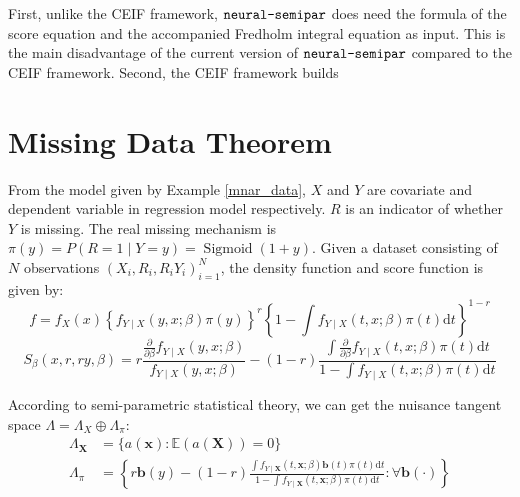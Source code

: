 \documentclass[11pt]{article}
\def\neurosemi{{\normalfont\texttt{neural-semipar}}}
\begin{document}
First, unlike the CEIF framework, $\neurosemi$ does need the formula of the score equation and the accompanied Fredholm integral equation as input. This is the main disadvantage of the current version of $\neurosemi$ compared to the CEIF framework. Second, the CEIF framework builds

\section{Missing Data Theorem}
\label{MNAR_Theorem}

From the model given by Example \ref{mnar_data}, $X$ and $Y$ are covariate and dependent variable in regression model respectively. $R$ is an indicator of whether $Y$ is missing. The real missing mechanism is $\pi(y)=P(R=1 \mid Y=y)=\operatorname{Sigmoid}(1+y)$. Given a dataset consisting of $N$ observations $(X_i,R_i,R_iY_i)^N_{i=1}$, the density function and score function is given by:
$$
f = f_X(x)\left\{f_{Y \mid X}(y, x ; \beta) \pi(y)\right\}^r\left\{1-\int f_{Y \mid X}(t, x ; \beta) \pi(t) \mathrm{d} t\right\}^{1-r}
$$
$$
S_\beta(x, r, r y, \beta)=r \frac{\frac{\partial}{\partial \beta} f_{Y \mid X}(y, x ; \beta)}{f_{Y \mid X}(y, x ; \beta)}-(1-r) \frac{\int \frac{\partial}{\partial \beta} f_{Y \mid X}(t, x ; \beta) \pi(t) \mathrm{d} t}{1-\int f_{Y \mid X}(t, x ; \beta) \pi(t) \mathrm{d} t}
$$

According to semi-parametric statistical theory, we can get the nuisance tangent space $\Lambda=\Lambda_X \oplus \Lambda_\pi$:
$$
\begin{aligned}
\Lambda_{\mathbf{X}} & =\{a(\mathbf{x}): \mathbb{E}(a(\mathbf{X}))=0\} \\
\Lambda_\pi & =\left\{r \mathbf{b}(y)-(1-r) \frac{\int f_{Y \mid \mathbf{X}}(t, \mathbf{x} ; \beta) \mathbf{b}(t) \pi(t) \mathrm{d} t}{1-\int f_{Y \mid \mathbf{X}}(t, \mathbf{x} ; \beta) \pi(t) \mathrm{d} t}: \forall \mathbf{b}(\cdot)\right\}
\end{aligned}
$$
\end{document}

